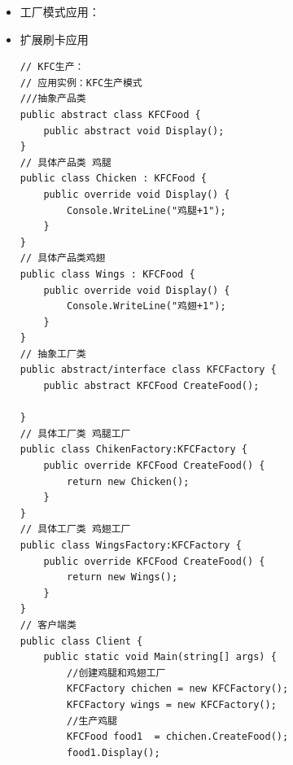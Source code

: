 \documentclass[9pt, b5paper]{article}
\begin{document}
\begin{itemize}
\begin{verbatim}
//  抽象产品类
abstract class BankCardHandle {
    public abstract void HandleProcess();
}
// 具体产品类VISA，继承抽象产品类
class VisaHandle : BankCardHandle {
    public override void HandleProcess() {
        Console.WriteLine("Visa卡处理中..");
    }
}
// 具体产品类Master，继承抽象产品类
class MasterCardHandle : BankCardHandle {
    public override void HandleProcess() {
        Console.WriteLine("Master卡处理中..");
    }
}
// 抽象工厂类
public abstract class HandleFactory {
    public abstract BankCardHandle CreateBankCardHandle();
}
// 具体工厂类，继承抽象工厂类
public class VisaFactory:HandleFactory {
    public override BankCardHandle CreateBackCardHandle() {
        return new VisaHandle();
    }
}
// 具体工厂类，继承抽象工厂类
public class MasterFactory:HandleFactory {
    public override BankCardHandle CreateBackCarHandle() {
        return new BankCardHandle();
    }
}
// 客户端调用
class Client {
    public static void Main(string[] args) {
        //实例化工厂
        HandleFactory visaFacotry = new VisaFactory();
        HandleFactory masterFactory = new MasterFactory();
        //创建卡类
        BankCardHandle vf = visaFacotry.CreateBackCarHandle();
        BankCardHandle mf = masterFactory.CreateBackCarHandle();
        //新添加的卡种
        HandleFactory unionFactory = new UnionPayCardFactory();
        BankCardHandle nf = unionFactory.CreateBackCarHandle();
    }
}
// 新添加的卡的特性
public class UnionPayCardHandle : BankCardHandle {
    public override void HandleProcess() {
        Console.WriteLine("银联卡处理中..");
    }
}
// 新添加的卡的工厂
public class UnionPayCardFactory : HandleFactory {
    public override BankCardHandle CreateBackCarHandle() {
        return new UnionPayCardHandle();
    }
}
\end{verbatim}
\item 工厂模式应用：
\item 扩展刷卡应用
\begin{verbatim}
// KFC生产：
// 应用实例：KFC生产模式
///抽象产品类
public abstract class KFCFood {
    public abstract void Display();
}
// 具体产品类 鸡腿
public class Chicken : KFCFood {
    public override void Display() {
        Console.WriteLine("鸡腿+1");
    }
}
// 具体产品类鸡翅
public class Wings : KFCFood {
    public override void Display() {
        Console.WriteLine("鸡翅+1");
    }
}
// 抽象工厂类
public abstract/interface class KFCFactory {
    public abstract KFCFood CreateFood();
 
}
// 具体工厂类 鸡腿工厂
public class ChikenFactory:KFCFactory {
    public override KFCFood CreateFood() {
        return new Chicken();
    }
}
// 具体工厂类 鸡翅工厂
public class WingsFactory:KFCFactory {
    public override KFCFood CreateFood() {
        return new Wings();
    }
}
// 客户端类
public class Client {
    public static void Main(string[] args) {
        //创建鸡腿和鸡翅工厂
        KFCFactory chichen = new KFCFactory();
        KFCFactory wings = new KFCFactory();
        //生产鸡腿
        KFCFood food1  = chichen.CreateFood();
        food1.Display();
 

\end{verbatim}
\end{itemize}
\end{document}

